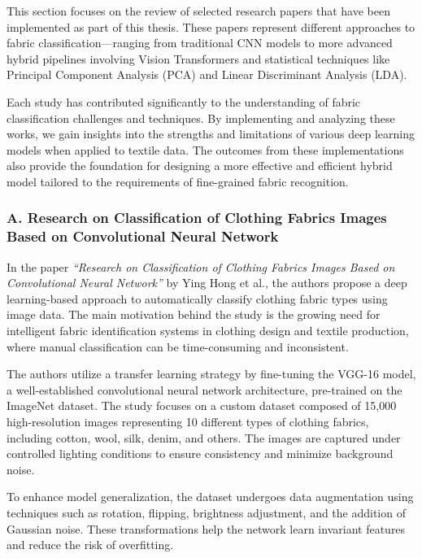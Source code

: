 This section focuses on the review of selected research papers that have been implemented as part of this thesis. These papers represent different approaches to fabric classification—ranging from traditional CNN models to more advanced hybrid pipelines involving Vision Transformers and statistical techniques like Principal Component Analysis (PCA) and Linear Discriminant Analysis (LDA).

Each study has contributed significantly to the understanding of fabric classification challenges and techniques. By implementing and analyzing these works, we gain insights into the strengths and limitations of various deep learning models when applied to textile data. The outcomes from these implementations also provide the foundation for designing a more effective and efficient hybrid model tailored to the requirements of fine-grained fabric recognition.

\subsubsection{A. Research on Classification of Clothing Fabrics Images Based on Convolutional Neural Network~\cite{hong2024research}}

In the paper \textit{“Research on Classification of Clothing Fabrics Images Based on Convolutional Neural Network”} by Ying Hong et al., the authors propose a deep learning-based approach to automatically classify clothing fabric types using image data. The main motivation behind the study is the growing need for intelligent fabric identification systems in clothing design and textile production, where manual classification can be time-consuming and inconsistent.

The authors utilize a transfer learning strategy by fine-tuning the VGG-16 model, a well-established convolutional neural network architecture, pre-trained on the ImageNet dataset. The study focuses on a custom dataset composed of 15,000 high-resolution images representing 10 different types of clothing fabrics, including cotton, wool, silk, denim, and others. The images are captured under controlled lighting conditions to ensure consistency and minimize background noise.

To enhance model generalization, the dataset undergoes data augmentation using techniques such as rotation, flipping, brightness adjustment, and the addition of Gaussian noise. These transformations help the network learn invariant features and reduce the risk of overfitting.

